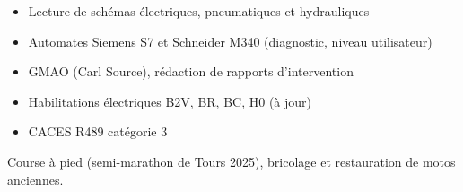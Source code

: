 \documentclass[11pt]{article}
\begin{document}
\begin{itemize}[leftmargin=14pt,itemsep=1pt]
\item Lecture de schémas électriques, pneumatiques et hydrauliques
\item Automates Siemens S7 et Schneider M340 (diagnostic, niveau utilisateur)
\item GMAO (Carl Source), rédaction de rapports d'intervention
\item Habilitations électriques B2V, BR, BC, H0 (à jour)
\item CACES R489 catégorie 3
\end{itemize}

Course à pied (semi-marathon de Tours 2025), bricolage et restauration de motos anciennes.
\enlargethispage{4\baselineskip}
\docfooter
\end{document}
